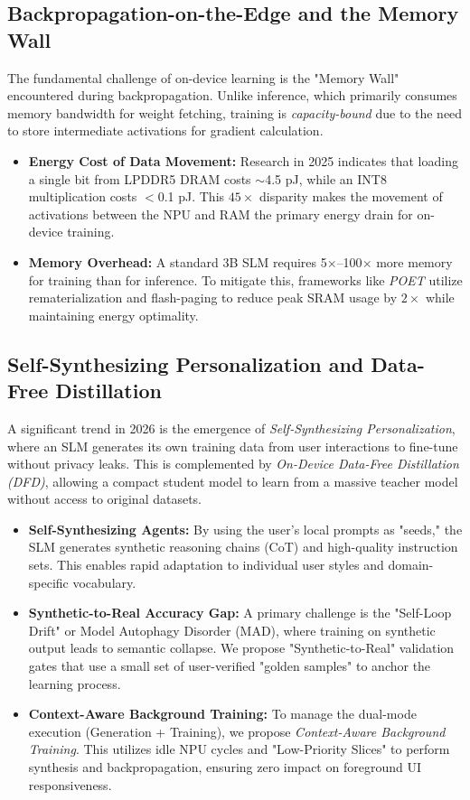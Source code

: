 \documentclass[twocolumn,10pt]{article}
\begin{document}
\subsection{Backpropagation-on-the-Edge and the Memory Wall}
The fundamental challenge of on-device learning is the "Memory Wall" encountered during backpropagation. Unlike inference, which primarily consumes memory bandwidth for weight fetching, training is \textit{capacity-bound} due to the need to store intermediate activations for gradient calculation.
\begin{itemize}
    \item \textbf{Energy Cost of Data Movement:} Research in 2025 indicates that loading a single bit from LPDDR5 DRAM costs $\sim$4.5 pJ, while an INT8 multiplication costs $<$0.1 pJ. This $45\times$ disparity makes the movement of activations between the NPU and RAM the primary energy drain for on-device training.
    \item \textbf{Memory Overhead:} A standard 3B SLM requires 5$\times$--100$\times$ more memory for training than for inference. To mitigate this, frameworks like \textit{POET} \cite{poet2024} utilize rematerialization and flash-paging to reduce peak SRAM usage by $2\times$ while maintaining energy optimality.
\end{itemize}

\subsection{Self-Synthesizing Personalization and Data-Free Distillation}
A significant trend in 2026 is the emergence of \textit{Self-Synthesizing Personalization}, where an SLM generates its own training data from user interactions to fine-tune without privacy leaks. This is complemented by \textit{On-Device Data-Free Distillation (DFD)}, allowing a compact student model to learn from a massive teacher model without access to original datasets.
\begin{itemize}
    \item \textbf{Self-Synthesizing Agents:} By using the user's local prompts as "seeds," the SLM generates synthetic reasoning chains (CoT) and high-quality instruction sets. This enables rapid adaptation to individual user styles and domain-specific vocabulary.
    \item \textbf{Synthetic-to-Real Accuracy Gap:} A primary challenge is the "Self-Loop Drift" or Model Autophagy Disorder (MAD), where training on synthetic output leads to semantic collapse. We propose "Synthetic-to-Real" validation gates that use a small set of user-verified "golden samples" to anchor the learning process.
    \item \textbf{Context-Aware Background Training:} To manage the dual-mode execution (Generation + Training), we propose \textit{Context-Aware Background Training}. This utilizes idle NPU cycles and "Low-Priority Slices" to perform synthesis and backpropagation, ensuring zero impact on foreground UI responsiveness.
\end{itemize}
\end{document}

